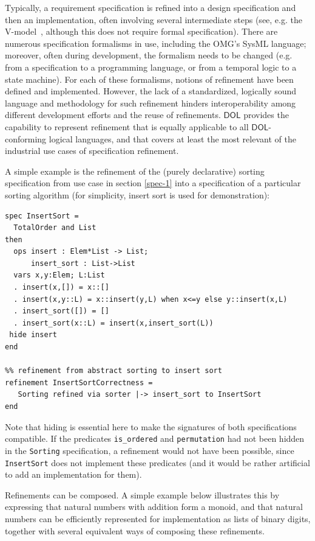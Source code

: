 \documentclass[10pt, a4paper]{isov2}
\newcommand*{\DOL}{\ensuremath{\mathsf{DOL}}\xspace}
\begin{document}
Typically, a requirement specification is refined into a
design specification and then an implementation, often involving
several intermediate steps (see, e.g. the V-model~\cite{V-model}, although
this does not require formal specification).  There are numerous
specification formalisms in use, including the OMG's SysML language;
moreover, often during development, the formalism needs to be changed
(e.g. from a specification to a programming language, or from a
temporal logic to a state machine). For each of these formalisms,
notions of refinement have been defined and implemented. However, the
lack of a standardized, logically sound language and methodology for
such refinement hinders interoperability among different development
efforts and the reuse of refinements.  \DOL provides the capability to
represent refinement that is equally applicable to all \DOL-conforming
logical languages, and that covers at least the most relevant of the
industrial use cases of specification refinement.

A simple example is the refinement of the (purely declarative) sorting
specification from use case in section \ref{spec-1} into a specification of a particular sorting
algorithm (for simplicity, insert sort is used for demonstration):

\begin{lstlisting}[basicstyle=\ttfamily\footnotesize,language=dolText,alsolanguage=CASL,escapechar=@,mathescape]	
spec InsertSort = 
  TotalOrder and List
then
  ops insert : Elem*List -> List;
      insert_sort : List->List
  vars x,y:Elem; L:List
  . insert(x,[]) = x::[]
  . insert(x,y::L) = x::insert(y,L) when x<=y else y::insert(x,L)
  . insert_sort([]) = []
  . insert_sort(x::L) = insert(x,insert_sort(L))
 hide insert
end

%% refinement from abstract sorting to insert sort
refinement InsertSortCorrectness =
   Sorting refined via sorter |-> insert_sort to InsertSort
end
\end{lstlisting}
Note that hiding is essential here to make the signatures of
both specifications compatible. If  the
predicates \texttt{is\_ordered} and \texttt{permutation}
had not been hidden in the \texttt{Sorting} specification, a refinement would
not have been possible, since \texttt{InsertSort} does not
implement these predicates (and it would be rather artificial
to add an implementation for them).

\medskip

Refinements can be composed. A simple example below illustrates this
by expressing that natural numbers with addition form a monoid, and
that natural numbers can be efficiently represented for implementation
as lists of binary digits, together with several equivalent ways of
composing these refinements.
\end{document}
